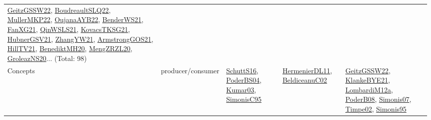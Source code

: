 {\begin{longtable}{lp{3cm}>{\raggedright}p{6cm}>{\raggedright}p{6cm}p{8cm}}
\href{papers/GeitzGSSW22.pdf}{GeitzGSSW22}\cite{GeitzGSSW22}, \href{papers/BoudreaultSLQ22.pdf}{BoudreaultSLQ22}\cite{BoudreaultSLQ22}, \href{articles/MullerMKP22.pdf}{MullerMKP22}\cite{MullerMKP22}, \href{papers/OujanaAYB22.pdf}{OujanaAYB22}\cite{OujanaAYB22}, \href{papers/BenderWS21.pdf}{BenderWS21}\cite{BenderWS21}, \href{articles/FanXG21.pdf}{FanXG21}\cite{FanXG21}, \href{articles/QinWSLS21.pdf}{QinWSLS21}\cite{QinWSLS21}, \href{papers/KovacsTKSG21.pdf}{KovacsTKSG21}\cite{KovacsTKSG21}, \href{articles/HubnerGSV21.pdf}{HubnerGSV21}\cite{HubnerGSV21}, \href{articles/ZhangYW21.pdf}{ZhangYW21}\cite{ZhangYW21}, \href{papers/ArmstrongGOS21.pdf}{ArmstrongGOS21}\cite{ArmstrongGOS21}, \href{papers/HillTV21.pdf}{HillTV21}\cite{HillTV21}, \href{articles/BenediktMH20.pdf}{BenediktMH20}\cite{BenediktMH20}, \href{articles/MengZRZL20.pdf}{MengZRZL20}\cite{MengZRZL20}, \href{papers/GroleazNS20.pdf}{GroleazNS20}\cite{GroleazNS20}... (Total: 98)\\
Concepts & producer/consumer & \href{papers/SchuttS16.pdf}{SchuttS16}\cite{SchuttS16}, \href{articles/PoderBS04.pdf}{PoderBS04}\cite{PoderBS04}, \href{papers/Kumar03.pdf}{Kumar03}\cite{Kumar03}, \href{papers/SimonisC95.pdf}{SimonisC95}\cite{SimonisC95} & \href{papers/HermenierDL11.pdf}{HermenierDL11}\cite{HermenierDL11}, \href{papers/BeldiceanuC02.pdf}{BeldiceanuC02}\cite{BeldiceanuC02} & \href{papers/GeitzGSSW22.pdf}{GeitzGSSW22}\cite{GeitzGSSW22}, \href{papers/KlankeBYE21.pdf}{KlankeBYE21}\cite{KlankeBYE21}, \href{articles/LombardiM12a.pdf}{LombardiM12a}\cite{LombardiM12a}, \href{papers/PoderB08.pdf}{PoderB08}\cite{PoderB08}, \href{articles/Simonis07.pdf}{Simonis07}\cite{Simonis07}, \href{articles/Timpe02.pdf}{Timpe02}\cite{Timpe02}, \href{papers/Simonis95.pdf}{Simonis95}\cite{Simonis95}\\

\end{longtable}}
